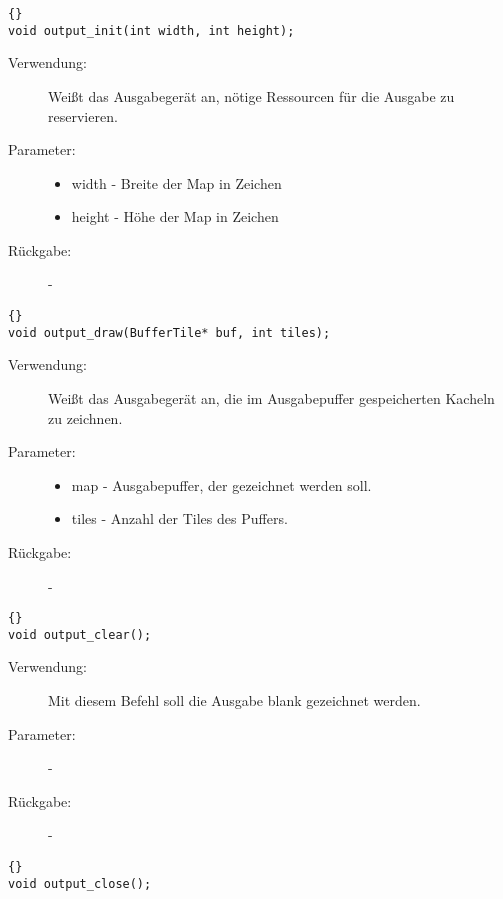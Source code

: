 \documentclass[11pt,a4paper,notitlepage]{report}
\begin{document}
		\begin{lstlisting}[caption=output\_init]{}
void output_init(int width, int height);
		\end{lstlisting}
		
	\begin{description}
		\item[Verwendung:] Weißt das Ausgabegerät an, nötige Ressourcen für die Ausgabe zu reservieren.
		\item[Parameter:] \hfill
		\begin{itemize}
			\item width - Breite der Map in Zeichen
			\item height - Höhe der Map in Zeichen
		\end{itemize}
		\item[Rückgabe:] -
	\end{description}
	
		\begin{lstlisting}[caption=output\_draw]{}
void output_draw(BufferTile* buf, int tiles);
		\end{lstlisting}
		
	\begin{description}
		\item[Verwendung:] Weißt das Ausgabegerät an, die im Ausgabepuffer gespeicherten Kacheln zu zeichnen.
		\item[Parameter:] \hfill
		\begin{itemize}
			\item map - Ausgabepuffer, der gezeichnet werden soll.
			\item tiles - Anzahl der Tiles des Puffers.
		\end{itemize}
		\item[Rückgabe:] -
	\end{description}
	
		\begin{lstlisting}[caption=output\_clear]{}
void output_clear();
		\end{lstlisting}
		
	\begin{description}
		\item[Verwendung:] Mit diesem Befehl soll die Ausgabe blank gezeichnet werden.
		\item[Parameter:] -
		\item[Rückgabe:] -
	\end{description}
	
		\begin{lstlisting}[caption=output\_close]{}
void output_close();
		\end{lstlisting}
		
\end{document}
